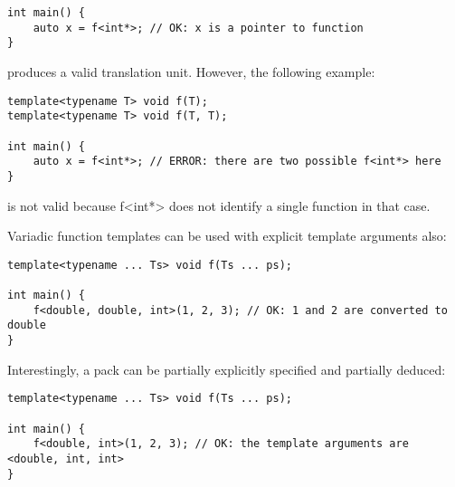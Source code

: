 \begin{lstlisting}[style=styleCXX]
int main() {
	auto x = f<int*>; // OK: x is a pointer to function
}
\end{lstlisting}

produces a valid translation unit. However, the following example:

\begin{lstlisting}[style=styleCXX]
template<typename T> void f(T);
template<typename T> void f(T, T);

int main() {
	auto x = f<int*>; // ERROR: there are two possible f<int*> here
}
\end{lstlisting}

is not valid because f<int*> does not identify a single function in that case.

Variadic function templates can be used with explicit template arguments also:

\begin{lstlisting}[style=styleCXX]
template<typename ... Ts> void f(Ts ... ps);

int main() {
	f<double, double, int>(1, 2, 3); // OK: 1 and 2 are converted to double
}
\end{lstlisting}

Interestingly, a pack can be partially explicitly specified and partially deduced:

\begin{lstlisting}[style=styleCXX]
template<typename ... Ts> void f(Ts ... ps);

int main() {
	f<double, int>(1, 2, 3); // OK: the template arguments are <double, int, int>
}
\end{lstlisting}









